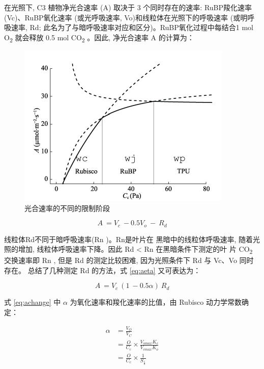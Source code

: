 \documentclass[
]{krantz}
\begin{document}
在光照下, C3 植物净光合速率 (A) 取决于 3 个同时存在的速率: RuBP羧化速率(Vc)、RuBP氧化速率 (或光呼吸速率,
Vo)和线粒体在光照下的呼吸速率 (或明呼吸速率, Rd; 此名为了与暗呼吸速率对应和区分)。RuBP氧化过程中每结合1 mol
O\textsubscript{2} 就会释放 0.5 mol CO\textsubscript{2} 。因此, 净光合速率 A 的计算为：

\begin{figure}
\includegraphics[width=1\linewidth]{images/fvcb} \caption{光合速率的不同的限制阶段}\label{fig:fvcb}
\end{figure}

\begin{equation}
A\ =V_{c}\ -0.5V_{o}\ -\ R_{d}
\label{eq:aeta}
\end{equation}

线粒体Rd不同于暗呼吸速率(Rn )。Rn是叶片在 黑暗中的线粒体呼吸速率, 随着光照的增加, 线粒体呼吸速率下降。因此 Rd \textless{}
Rn 在黑暗条件下测定的叶 片 CO\textsubscript{2} 交换速率即 Rn , 但是 Rd 的测定比较困难, 因为光照条件下 Rd 与
Vc、Vo 同时存在。\citet{Hikosaka2006Temperature} 总结了几种测定
Rd 的方法，式 \eqref{eq:aeta} 又可表达为：

\begin{equation}
A\ =V_{c}\ (1\ -0.5\alpha)\ R_{d}
\label{eq:achange}
\end{equation}

式 \eqref{eq:achange} 中 \(\alpha\) 为氧化速率和羧化速率的比值，由 Rubisco 动力学常数确定：

\begin{equation}
\begin{split}
\alpha & =\frac{V_{O}}{V_{C}}\\
& = \frac{O}{C_c} \times \frac{V_{omax} K_c}{V_{cmax}K_{o}}\\
& = \frac{O}{C_{c}} \times \frac{1}{S_{\frac{c}{o}}}
\end{split}
\label{eq:dynamic}
\end{equation}
\end{document}
